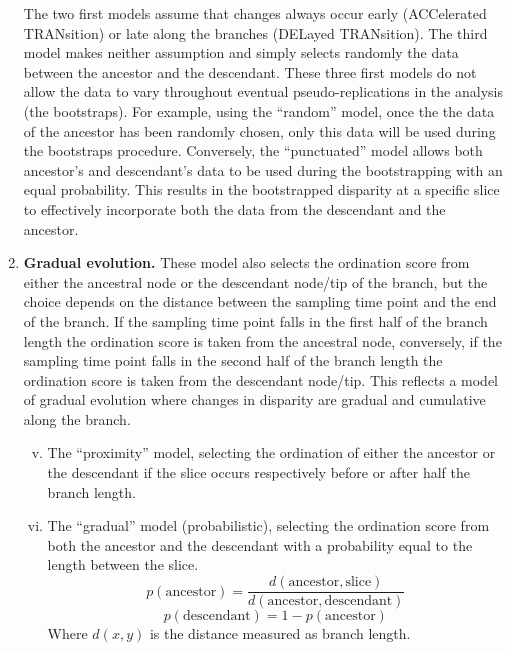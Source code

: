 \documentclass[12pt,a4paper]{article}
\begin{document}
\begin{enumerate}
    The two first models assume that changes always occur early (ACCelerated TRANsition) or late along the branches (DELayed TRANsition).
    The third model makes neither assumption and simply selects randomly the data between the ancestor and the descendant.
    These three first models do not allow the data to vary throughout eventual pseudo-replications in the analysis (the bootstraps).
    For example, using the ``random'' model, once the the data of the ancestor has been randomly chosen, only this data will be used during the bootstraps procedure.
    Conversely, the ``punctuated'' model allows both ancestor's and descendant's data to be used during the bootstrapping with an equal probability.
    This results in the bootstrapped disparity at a specific slice to effectively incorporate both the data from the descendant and the ancestor. %

    \item{\textbf{Gradual evolution.}}
    These model also selects the ordination score from either the ancestral node or the descendant node/tip of the branch, but the choice depends on the distance between the sampling time point and the end of the branch.
    If the sampling time point falls in the first half of the branch length the ordination score is taken from the ancestral node, conversely, if the sampling time point falls in the second half of the branch length the ordination score is taken from the descendant node/tip.
    This reflects a model of gradual evolution where changes in disparity are gradual and cumulative along the branch.
  
    \begin{enumerate}[(i)]
    \setcounter{enumii}{4}
    \item The ``proximity'' model, selecting the ordination of either the ancestor or the descendant if the slice occurs respectively before or after half the branch length.
    \item The ``gradual'' model (probabilistic), selecting the ordination score from both the ancestor and the descendant with a probability equal to the length between the slice.
          \begin{equation}
              p(\text{ancestor}) = \frac{d(\text{ancestor},\text{slice})}{d(\text{ancestor},\text{descendant})}
          \end{equation}
          \begin{equation}
              p(\text{descendant}) = 1 - p(\text{ancestor})
          \end{equation}
    \noindent Where $d(x,y)$ is the distance measured as branch length.
    \end{enumerate}


\end{enumerate}
\end{document}
